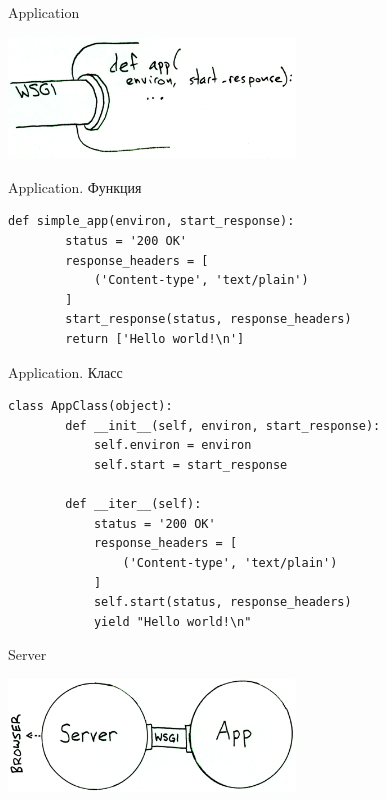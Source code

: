 \begin{frame}{Application}

    \begin{center}
        \vspace{-0.35in}\includegraphics[width=3in]{media/wsgi-app.png}
    \end{center}

\end{frame}

\begin{frame}[fragile]{Application. Функция}

    \vspace{-1in}
    \begin{lstlisting}[style=python, caption=simple WSGI application]
    def simple_app(environ, start_response):
        status = '200 OK'
        response_headers = [
            ('Content-type', 'text/plain')
        ]
        start_response(status, response_headers)
        return ['Hello world!\n']
    \end{lstlisting}

\end{frame}

\begin{frame}[fragile]{Application. Класс}

    \begin{lstlisting}[style=python, caption=WSGI app class]
    class AppClass(object):
        def __init__(self, environ, start_response):
            self.environ = environ
            self.start = start_response

        def __iter__(self):
            status = '200 OK'
            response_headers = [
                ('Content-type', 'text/plain')
            ]
            self.start(status, response_headers)
            yield "Hello world!\n"
    \end{lstlisting}

\end{frame}

\begin{frame}{Server}

    \begin{center}
        \vspace{-0.35in}\includegraphics[width=3in]{media/server-app.png}
    \end{center}

\end{frame}


